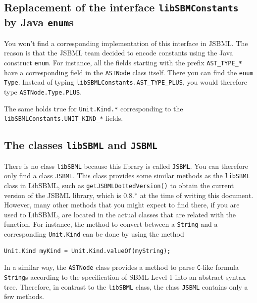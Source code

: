 \documentclass[
  BCOR12mm,
  letterpaper,
  11pt,
  headsepline,
  pointlessnumbers,
  tablecaptionabove,
  onelinecaption,
  headinclude,
  appendixprefix,
  idxtotoc,
  bibtotoc,
  twoside,
  titlepage
]{scrartcl}
\begin{document}
\subsection{Replacement of the interface \texttt{libSBMConstants} by Java \texttt{enum}s}

You won't find a corresponding implementation of this interface in 
JSBML. The reason is that the JSBML team decided to encode constants using the
Java construct \texttt{enum}. For instance, all the fields starting with the
prefix \texttt{AST\_TYPE\_*}
 have a
corresponding field in the \texttt{ASTNode} class itself. There you can find the
\texttt{enum} \texttt{Type}.
Instead of typing \texttt{libSBMLConstants.AST\_TYPE\_PLUS}, you would therefore
type \texttt{ASTNode.Type.PLUS}.

The same holds true for \texttt{Unit.Kind.*} corresponding to the
\texttt{libSBMLConstants.UNIT\_KIND\_*}
 fields.

\subsection{The classes \texttt{libSBML} and \texttt{JSBML}}

There is no class \texttt{libSBML} because this library is called
\texttt{JSBML}. You can
therefore only find a class \texttt{JSBML}. This
class provides some similar methods as the \texttt{libSBML} class in LibSBML,
such as \texttt{getJSBMLDottedVersion()}
 to obtain the current
version of the JSBML library, which is 0.8.* at the time of writing this
document. However, many other methods that you might expect
to find there, if you are used to LibSBML, are located in the actual classes
that are related with the function. For instance, the method to convert between
a \texttt{String} and
a corresponding \texttt{Unit.Kind} can be done
by using the method
\begin{lstlisting}
Unit.Kind myKind = Unit.Kind.valueOf(myString);
\end{lstlisting}
In a similar way, the \texttt{ASTNode} class provides a method to parse
\texttt{C}-like
formula \texttt{String}s according to the specification of SBML Level 1
\citep{Hucka2003} into an abstract syntax tree. Therefore, in contrast to the
\texttt{libSBML} class, the class \texttt{JSBML} contains only a few methods.
\end{document}
